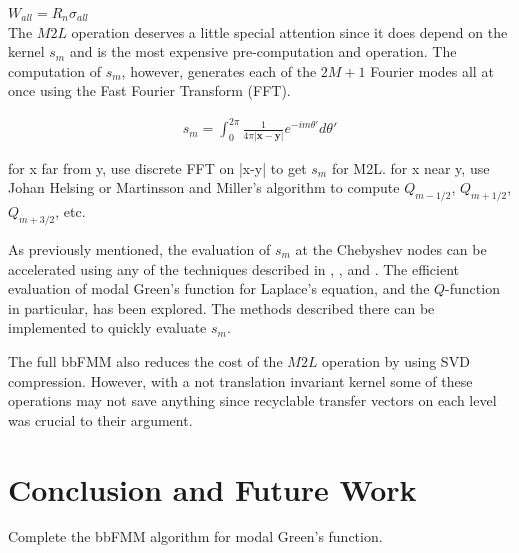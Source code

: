 \documentclass[11pt, oneside]{article}   	%
\begin{document}
$W_{all} = R_n \sigma_{all}$\\

The $M2L$ operation deserves a little special attention since it does depend on the kernel $s_m$ and is the most expensive pre-computation and operation. The computation of $s_m$, however, generates each of the $2M+1$ Fourier modes all at once using the Fast Fourier Transform (FFT).

\begin{align}
s_m = \int_0^{2\pi} \frac{1}{4\pi|\mathbf{x}-\mathbf{y}|}e^{-im\theta'}d\theta'
\end{align}

for x far from y, use discrete FFT on |x-y| to get $s_m$ for M2L. for x near y, use Johan Helsing or Martinsson and Miller's algorithm to compute $Q_{m-1/2}$, $Q_{m+1/2}$, $Q_{m+3/2}$, etc.

As previously mentioned, the evaluation of $s_m$ at the Chebyshev nodes can be accelerated using any of the techniques described in \cite{A}, \cite{VBT}, and \cite{YFC}. The efficient evaluation of modal Green's function for Laplace's equation, and the $Q$-function in particular, has been explored. The methods described there can be implemented to quickly evaluate $s_m$.

The full bbFMM also reduces the cost of the $M2L$ operation by using SVD compression. However, with a not translation invariant kernel some of these operations may not save anything since recyclable transfer vectors on each level was crucial to their argument.

\section{Conclusion and Future Work}
Complete the bbFMM algorithm for modal Green's function.
\end{document}
